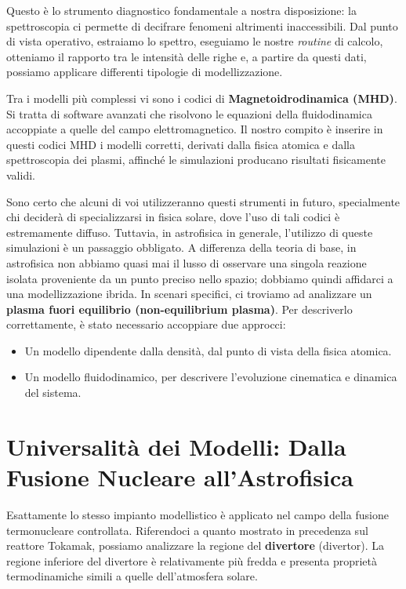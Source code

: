Questo è lo strumento diagnostico fondamentale a nostra disposizione: la spettroscopia ci permette di decifrare fenomeni altrimenti inaccessibili. Dal punto di vista operativo, estraiamo lo spettro, eseguiamo le nostre \textit{routine} di calcolo, otteniamo il rapporto tra le intensità delle righe e, a partire da questi dati, possiamo applicare differenti tipologie di modellizzazione.

Tra i modelli più complessi vi sono i codici di \textbf{Magnetoidrodinamica (MHD)}. Si tratta di software avanzati che risolvono le equazioni della fluidodinamica accoppiate a quelle del campo elettromagnetico. Il nostro compito è inserire in questi codici MHD i modelli corretti, derivati dalla fisica atomica e dalla spettroscopia dei plasmi, affinché le simulazioni producano risultati fisicamente validi.

Sono certo che alcuni di voi utilizzeranno questi strumenti in futuro, specialmente chi deciderà di specializzarsi in fisica solare, dove l'uso di tali codici è estremamente diffuso. Tuttavia, in astrofisica in generale, l'utilizzo di queste simulazioni è un passaggio obbligato.
A differenza della teoria di base, in astrofisica non abbiamo quasi mai il lusso di osservare una singola reazione isolata proveniente da un punto preciso nello spazio; dobbiamo quindi affidarci a una modellizzazione ibrida. In scenari specifici, ci troviamo ad analizzare un \textbf{plasma fuori equilibrio (non-equilibrium plasma)}. Per descriverlo correttamente, è stato necessario accoppiare due approcci:

\begin{itemize}
    \item Un modello dipendente dalla densità, dal punto di vista della fisica atomica.
    \item Un modello fluidodinamico, per descrivere l'evoluzione cinematica e dinamica del sistema.
\end{itemize}

\section{Universalità dei Modelli: Dalla Fusione Nucleare all'Astrofisica}

Esattamente lo stesso impianto modellistico è applicato nel campo della fusione termonucleare controllata. Riferendoci a quanto mostrato in precedenza sul reattore Tokamak, possiamo analizzare la regione del \textbf{divertore} (divertor). La regione inferiore del divertore è relativamente più fredda e presenta proprietà termodinamiche simili a quelle dell'atmosfera solare.

